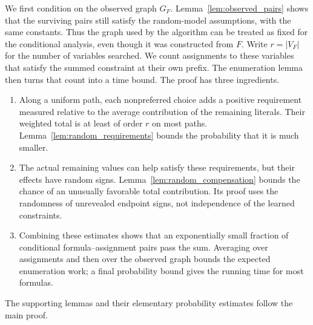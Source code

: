 \documentclass[11pt,a4paper]{article}
\theoremstyle{definition}
\theoremstyle{remark}
\begin{document}
We first condition on the observed graph $G_F$. Lemma~\ref{lem:observed_pairs}
shows that the surviving pairs still satisfy the random-model assumptions,
with the same constants. Thus the graph used by the algorithm can be
treated as fixed for the conditional analysis, even though it was
constructed from $F$. Write $r=|V_F|$ for the number of variables searched.
We count assignments to these variables that satisfy the summed constraint
at their own prefix. The enumeration lemma then turns that count into a
time bound. The proof has three ingredients.
\begin{enumerate}
\item Along a uniform path, each nonpreferred choice adds a positive
requirement measured relative to the average contribution of the
remaining literals. Their weighted total is at least of order $r$ on
most paths. Lemma~\ref{lem:random_requirements} bounds the probability
that it is much smaller.
\item The actual remaining values can help satisfy these requirements,
but their effects have random signs. Lemma~\ref{lem:random_compensation}
bounds the chance of an unusually favorable total contribution.
Its proof uses the randomness of unrevealed endpoint signs, not
independence of the learned constraints.
\item Combining these estimates shows that an exponentially small
fraction of conditional formula--assignment pairs pass the sum. Averaging
over assignments and then over the observed graph bounds the expected
enumeration work; a final probability bound gives the running time for
most formulas.
\end{enumerate}
The supporting lemmas and their elementary probability estimates follow
the main proof.
\end{document}
